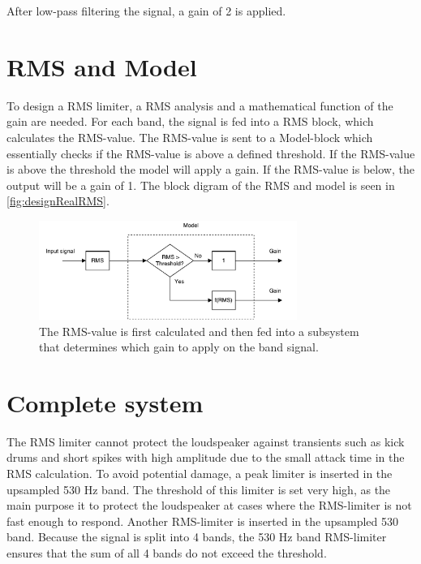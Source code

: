 After low-pass filtering the signal, a gain of 2 is applied.


\section{RMS and Model}

To design a RMS limiter, a RMS analysis and a mathematical function of the gain are needed. For each band, the signal is fed into a RMS block, which calculates the RMS-value. The RMS-value is sent to a Model-block which essentially checks if the RMS-value is above a defined threshold. If the RMS-value is above the threshold the model will apply a gain. If the RMS-value is below, the output will be a gain of 1. The block digram of the RMS and model is seen in \autoref{fig:designRealRMS}.

\begin{figure}[H]
\centering
\includegraphics[width=0.75\textwidth]{figures/designRealRMS.pdf}
\caption{The RMS-value is first calculated and then fed into a subsystem that determines which gain to apply on the band signal.}
\label{fig:designRealRMS}
\end{figure}




\section{Complete system}

The RMS limiter cannot protect the loudspeaker against transients such as kick drums and short spikes with high amplitude due to the small attack time in the RMS calculation. To avoid potential damage, a peak limiter is inserted in the upsampled 530 Hz band. The threshold of this limiter is set very high, as the main purpose it to protect the loudspeaker at cases where the RMS-limiter is not fast enough to respond. Another RMS-limiter is inserted in the upsampled 530 band. Because the signal is split into 4 bands, the 530 Hz band RMS-limiter ensures that the sum of all 4 bands do not exceed the threshold.

